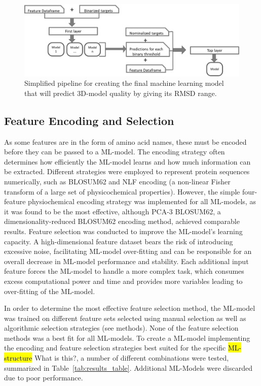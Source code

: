 \documentclass[12pt]{article}
\newcommand{\lilian}[1]{ {\color{red}{\bfseries Lilian:} #1}}
\newcommand{\highlight}[1]{\hl{#1}}
\begin{document}
\begin{figure}
  \centering
  \includegraphics[width=\textwidth]{simple_flow.eps}
  \caption {Simplified pipeline for creating the final machine learning model that will predict 3D-model quality by giving its RMSD range.}
  \label{fig:flow}
\end{figure}

\subsection{Feature Encoding and Selection}

As some features are in the form of amino acid names, these must be
encoded before they can be passed to a ML-model. The
encoding strategy often determines how efficiently the ML-model learns
and how much information can be extracted. Different strategies were
employed to represent protein sequences numerically, such as BLOSUM62\cite{Henikoff1992} and NLF\cite{Nanni2011} encoding (a non-linear Fisher transform of a large set of physicochemical properties). However, the simple four-feature physiochemical encoding strategy\cite{Abhinandan2010} was implemented for all ML-models, as it was found to be
the most effective, although PCA-3 BLOSUM62, a dimensionality-reduced
BLOSUM62 encoding method, achieved comparable results.
Feature selection was conducted to improve the ML-model's learning
capacity. A high-dimensional feature dataset bears the risk of
introducing excessive noise, facilitating ML-model over-fitting and can be
responsible for an overall decrease in ML-model performance and
stability. Each additional input feature forces the ML-model to
handle a more complex task, which consumes excess computational power
and time and provides more variables leading to over-fitting of the ML-model.

In order to
determine the most effective feature selection method, the
ML-model was trained on different feature sets selected using manual
selection as well as algorithmic selection strategies (see methods).
None of the
feature selection methods was a best fit for all ML-models. To create a ML-model implementing the encoding and feature selection strategies best suited for the specific \highlight{ML-structure} \lilian{What is this?}, a number of different combinations were tested, summarized in Table~\ref{tab:results_table}. Additional ML-Models were discarded due to poor performance. 
\end{document}
